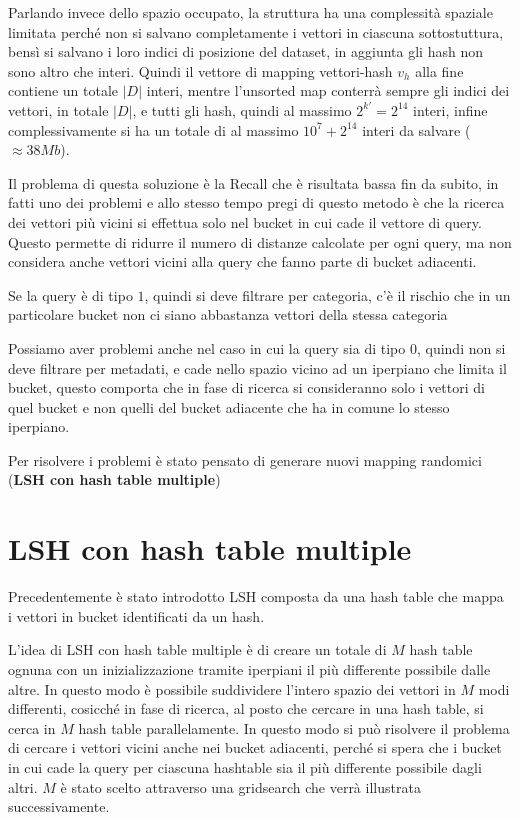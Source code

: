 Parlando invece dello spazio occupato, la struttura ha una complessità spaziale 
limitata perché non si salvano completamente i vettori in ciascuna sottostuttura,
bensì si salvano i loro indici di posizione del dataset, in aggiunta gli hash non 
sono altro che interi. Quindi il vettore di mapping vettori-hash $v_h$ alla fine 
contiene un totale $|D|$ interi, mentre l'unsorted map conterrà sempre gli indici 
dei vettori, in totale $|D|$, e tutti gli hash, quindi al massimo $2^{k'} = 2^ {14}$ 
interi, infine complessivamente si ha un totale di al massimo $10^7 + 2^{14}$ interi 
da salvare ($\approx 38 Mb$).

Il problema di questa soluzione è la Recall che è risultata bassa fin da subito, 
in fatti uno dei problemi e allo stesso tempo pregi di questo metodo è che la ricerca 
dei vettori più vicini si effettua solo nel bucket in cui cade il vettore di query.
Questo permette di ridurre il numero di distanze calcolate per ogni query, ma non 
considera anche vettori vicini alla query che fanno parte di bucket adiacenti.

\begin{esempio}
    Se la query è di tipo $1$, quindi si deve filtrare per categoria, c'è il rischio 
    che in un particolare bucket non ci siano abbastanza vettori della stessa categoria
\end{esempio}

\begin{esempio}
    Possiamo aver problemi anche nel caso in cui la query sia di tipo $0$, quindi non si 
    deve filtrare per metadati, e cade nello spazio vicino ad un iperpiano che limita il bucket, 
    questo comporta che in fase di ricerca si consideranno solo i vettori di quel 
    bucket e non quelli del bucket adiacente che ha in comune lo stesso iperpiano. 
\end{esempio}

Per risolvere i problemi è stato pensato di generare nuovi mapping randomici (\textbf{LSH con hash table multiple})

\section{LSH con hash table multiple}

Precedentemente è stato introdotto LSH composta da una hash table che mappa i vettori 
in bucket identificati da un hash.

L'idea di LSH con hash table multiple è di creare un totale di $M$ hash table ognuna con un
inizializzazione tramite iperpiani il più differente possibile dalle altre. In questo 
modo è possibile suddividere l'intero spazio dei vettori in $M$ modi differenti,
cosicché in fase di ricerca, al posto che cercare in una hash table, si cerca 
in $M$ hash table parallelamente. In questo modo si può risolvere il problema di 
cercare i vettori vicini anche nei bucket adiacenti, perché si spera che i bucket 
in cui cade la query per ciascuna hashtable sia il più differente possibile dagli 
altri. $M$ è stato scelto attraverso una gridsearch che verrà illustrata successivamente.

